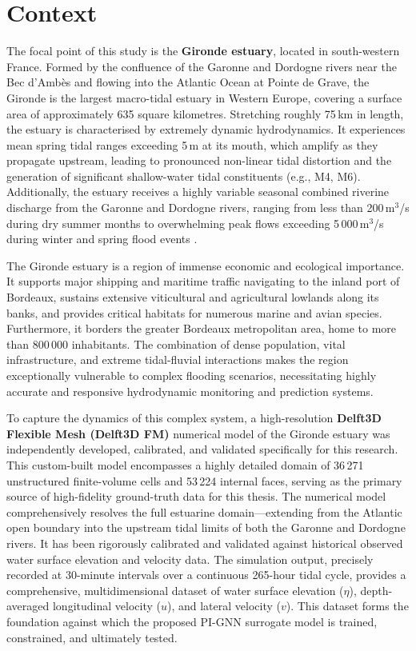 \section{Context}

The focal point of this study is the \textbf{Gironde estuary}, located in south-western
France. Formed by the confluence of the Garonne and Dordogne rivers near the Bec d'Ambès and flowing into the Atlantic Ocean at Pointe de Grave, the Gironde is the largest macro-tidal estuary in Western Europe, covering a surface area of approximately 635 square kilometres.
Stretching roughly 75\,km in length, the estuary is characterised by extremely dynamic hydrodynamics. It experiences mean spring tidal ranges exceeding 5\,m at its mouth, which amplify as they propagate upstream, leading to pronounced
non-linear tidal distortion and the generation of significant shallow-water tidal constituents (e.g., M4, M6). Additionally, the estuary receives a highly variable seasonal combined riverine discharge from the Garonne and Dordogne rivers, ranging from less than 200\,m$^3$/s during dry summer months to overwhelming peak flows exceeding 5\,000\,m$^3$/s during winter and spring flood events \cite{Sottolichio2000,
Jalón-Rojas2018}. 

The Gironde estuary is a region of immense economic and ecological importance. It supports major shipping and maritime traffic navigating to the inland
port of Bordeaux, sustains extensive viticultural and agricultural lowlands along its banks, and provides critical habitats for numerous marine and avian species. Furthermore, it borders the greater Bordeaux metropolitan area, home to more than 800\,000 inhabitants. The combination of dense population, vital infrastructure, and extreme tidal-fluvial interactions makes the region exceptionally vulnerable to complex flooding scenarios, necessitating highly accurate and responsive hydrodynamic monitoring and prediction systems.

To capture the dynamics of this complex system, a high-resolution \textbf{Delft3D Flexible Mesh (Delft3D FM)} numerical model of
the Gironde estuary was independently developed, calibrated, and validated specifically for this
research. This custom-built model encompasses a highly detailed domain of 36\,271 unstructured finite-volume cells
and 53\,224 internal faces, serving as the primary source of high-fidelity ground-truth data for this
thesis. The numerical model comprehensively resolves the full estuarine domain---extending from the Atlantic
open boundary into the upstream tidal limits of both the Garonne and
Dordogne rivers. It has been rigorously calibrated and validated against historical observed water surface elevation
and velocity data. The simulation output, precisely recorded at 30-minute intervals over
a continuous 265-hour tidal cycle, provides a comprehensive, multidimensional dataset of water surface
elevation ($\eta$), depth-averaged longitudinal velocity ($u$), and lateral velocity ($v$). This dataset forms the foundation against which the proposed PI-GNN surrogate model is trained, constrained, and ultimately tested.

